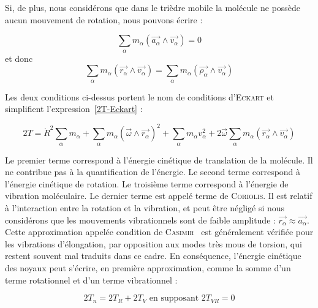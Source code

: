 Si, de plus, nous considérons que dans le trièdre mobile la molécule ne possède aucun mouvement de rotation, nous pouvons écrire :

\begin{equation}
	\sum_{\alpha}m_{\alpha}\left(\stackrel{\rightarrow}{a_{\alpha}} \wedge \stackrel{\rightarrow}{v_{\alpha}}\right) = 0
\end{equation}
\noindent et donc
\begin{equation}
	\sum_{\alpha}m_{\alpha}\left(\stackrel{\rightarrow}{r_{\alpha}} \wedge \stackrel{\rightarrow}{v_{\alpha}}\right) = \sum_{\alpha}m_{\alpha}\left(\stackrel{\rightarrow}{\rho_{\alpha}} \wedge \stackrel{\rightarrow}{v_{\alpha}}\right)
\end{equation}

Les deux conditions ci-dessus portent le nom de conditions d'\textsc{Eckart} et simplifient l'expression~\ref{2T-Eckart} :
	
\begin{equation}
	2T = \dot{R}^2\sum_{\alpha}m_{\alpha} + \sum_{\alpha}m_{\alpha}\left(\stackrel{\rightarrow}{\omega} \wedge \stackrel{\rightarrow}{r_{\alpha}}\right)^2 + \sum_{\alpha}m_{\alpha}v^2_{\alpha} + 2\stackrel{\rightarrow}{\omega}\sum_{\alpha}m_{\alpha}\left(\stackrel{\rightarrow}{r_{\alpha}} \wedge \stackrel{\rightarrow}{v_{\alpha}}\right)
\end{equation}

Le premier terme correspond à l'énergie cinétique de translation de la molécule. Il ne contribue pas à la quantification de l'énergie. Le second terme correspond  à l'énergie cinétique de rotation. Le troisième terme correspond à l'énergie de vibration moléculaire. Le dernier terme est appelé terme de \textsc{Coriolis}. Il est relatif à l'interaction entre la rotation et la vibration, et peut être négligé si nous considérons que les mouvements vibrationnels sont de faible amplitude : $\stackrel{\rightarrow}{r_{\alpha}} \approx \stackrel{\rightarrow}{a_{\alpha}}$. Cette approximation  appelée condition de \textsc{Casimir}~\cite{casimir1931rotation} est généralement vérifiée pour les vibrations d'élongation, par opposition aux modes très mous de torsion, qui restent souvent mal traduits dans ce cadre.
En conséquence, l'énergie cinétique des noyaux peut s'écrire, en première approximation, comme la somme d'un terme rotationnel et d'un terme vibrationnel :

\begin{equation}
	2T_n = 2T_R + 2 T_V \text{ en supposant }2T_{VR} = 0
\end{equation}

